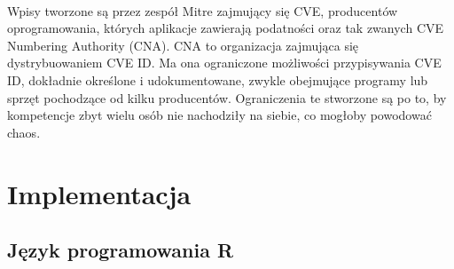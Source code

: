 \documentclass[a4paper,12pt,twoside]{article}
\begin{document}
\paragraph{}
Wpisy tworzone są przez zespół Mitre zajmujący się CVE, producentów oprogramowania, których aplikacje zawierają podatności oraz tak zwanych CVE Numbering Authority (CNA). CNA to organizacja zajmująca się dystrybuowaniem CVE ID. Ma ona ograniczone możliwości przypisywania CVE ID, dokładnie określone i udokumentowane, zwykle obejmujące programy lub sprzęt pochodzące od kilku producentów. Ograniczenia te stworzone są po to, by kompetencje zbyt wielu osób nie nachodziły na siebie, co mogłoby powodować chaos\cite{cve_mitre_cna_doc}.
\paragraph{}




\paragraph{}


\newpage
\section{Implementacja}

\subsection{Język programowania R}
\end{document}
